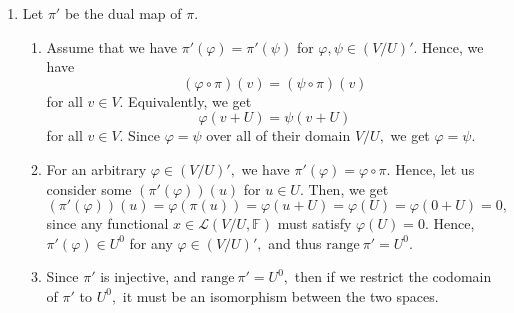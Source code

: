 \documentclass[12pt]{article}
\begin{document}
\begin{enumerate}
\begin{enumerate}
        Now, consider the case where $\dim V > 0$. Since $V$ is
        finite dimensional, and $\dim V \neq 0,$ extend $v$ into a
        basis $v, v_1, \ldots, v_n$ with
        $$
        \varphi(v) = 1, \varphi(v_k) = 0.
        $$
        This is a contradiction, since $\varphi(v) = 0$ for all $v
        \in V,$ and thus $v = 0.$ Thus, $\ker \Lambda = 0,$ and by rank-nullity,
        $$
        \dim V'' = \dim V= 0 + \dim \text{range} \ \Lambda = \dim
        \text{range} \ \Lambda.
        $$
        Thus, $\Lambda$ is an isomorphism.

        Otherwise, if $\dim V = 0,$ then $\dim V'' = 0  = \dim \ker
        \Lambda + \dim \text{range}\  \Lambda.$ Since $\dim \cdot
        \geq 0,$ we have $\dim \text{range} \ \Lambda = 0 = \dim V,$
        meaning $\Lambda$ is till an isomorphism.
    \end{enumerate}

  \item Let $\pi'$ be the dual map of $\pi.$
    \begin{enumerate}
      \item Assume that we have $\pi'(\varphi) = \pi'(\psi)$ for
        $\varphi, \psi \in (V/U)'.$ Hence, we have
        $$
        (\varphi \circ \pi)(v) = (\psi \circ \pi)(v)
        $$
        for all $v \in V.$ Equivalently, we get
        $$
        \varphi(v + U) = \psi(v + U)
        $$
        for all $v \in V.$ Since $\varphi = \psi$ over all of their
        domain $V/U,$ we get $\varphi = \psi.$

      \item For an arbitrary $\varphi \in (V/U)',$ we have
        $\pi'(\varphi) = \varphi \circ \pi.$ Hence, let us consider
        some $(\pi'(\varphi))(u)$ for $u \in U.$ Then, we get
        $$
        (\pi'(\varphi))(u) = \varphi(\pi(u)) = \varphi(u + U) =
        \varphi(U) = \varphi(0 + U)= 0,
        $$
        since any functional $x \in \mathcal L(V/U, \mathbb F)$ must
        satisfy $\varphi(U) = 0.$ Hence, $\pi'(\varphi) \in U^{0}$
        for any $\varphi \in (V/U)',$ and thus $\text{range}\ \pi' = U^{0}.$

      \item Since $\pi'$ is injective, and $\text{range} \ \pi' =
        U^{0},$ then if we restrict the codomain of $\pi'$ to
        $U^{0},$ it must be an isomorphism between the two spaces.
    \end{enumerate}
\end{enumerate}
\end{document}
